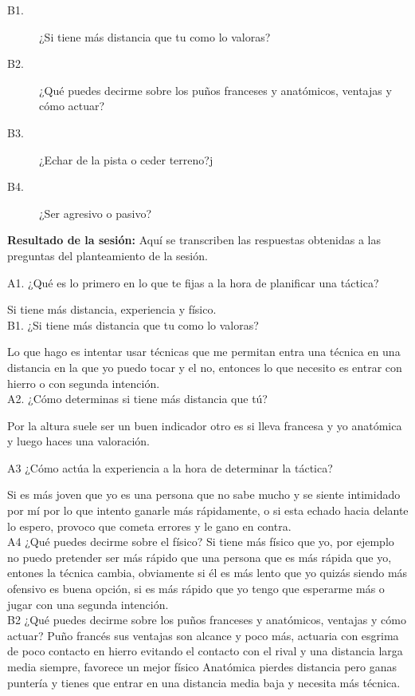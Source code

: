 \begin{description}
  \item [B1.] ¿Si tiene más distancia que tu como lo valoras?
  \item [B2.] ¿Qué puedes decirme sobre los puños franceses y anatómicos, ventajas y cómo actuar?
  \item [B3.] ¿Echar de la pista o ceder terreno?j
  \item [B4.] ¿Ser agresivo o pasivo?
\end{description}


\textbf{Resultado de la sesión:} Aquí se transcriben las respuestas obtenidas a las preguntas
 del planteamiento de la sesión.

A1. ¿Qué es lo primero en lo que te fijas a la hora de planificar una táctica?

Si tiene más distancia, experiencia y físico.
\\

B1. ¿Si tiene más distancia que tu como lo valoras?

Lo que hago es intentar usar técnicas que me permitan entra una técnica en una distancia en la
que yo puedo tocar y el no, entonces lo que necesito es entrar con hierro o con segunda
intención.
\\

A2. ¿Cómo determinas si tiene más distancia que tú?

Por la altura suele ser un buen indicador otro es si lleva francesa y yo anatómica y luego haces
una valoración.

A3 ¿Cómo actúa la experiencia a la hora de determinar la táctica?

Si es más joven que yo es una persona que no sabe mucho y se siente intimidado por mí por lo
que intento ganarle más rápidamente, o si esta echado hacia delante lo espero, provoco que
cometa errores y le gano en contra.
\\

A4 ¿Qué puedes decirme sobre el físico?
Si tiene más físico que yo, por ejemplo no puedo pretender ser más rápido que una persona que
es más rápida que yo, entones la técnica cambia, obviamente si él es más lento que yo quizás
siendo más ofensivo es buena opción, si es más rápido que yo tengo que esperarme más o jugar
con una segunda intención.
\\

B2 ¿Qué puedes decirme sobre los puños franceses y anatómicos, ventajas y cómo actuar?
Puño francés sus ventajas son alcance y poco más, actuaria con esgrima de poco contacto en
hierro evitando el contacto con el rival y una distancia larga media siempre, favorece un mejor
físico
Anatómica pierdes distancia pero ganas puntería y tienes que entrar en una distancia media baja
y necesita más técnica.
\\

